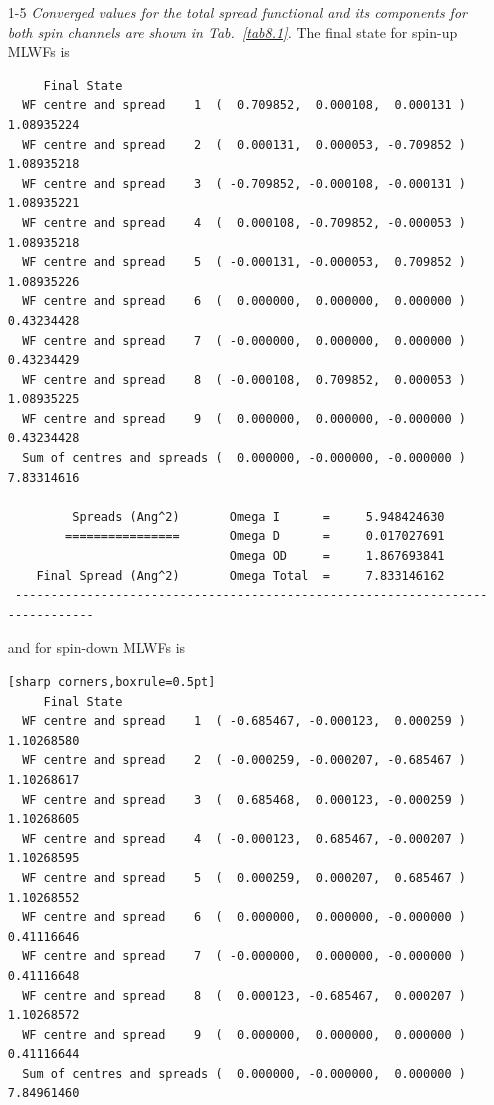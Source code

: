 \begin{enumerate}
	\item[1-5] {\it Converged values for the total spread functional and its components for both spin channels are shown in Tab.~\ref{tab8.1}.}
	The final state for spin-up MLWFs is
	\begin{tcolorbox}[sharp corners,boxrule=0.5pt]
	{\small
	\begin{verbatim}
	 Final State
  WF centre and spread    1  (  0.709852,  0.000108,  0.000131 )     1.08935224
  WF centre and spread    2  (  0.000131,  0.000053, -0.709852 )     1.08935218
  WF centre and spread    3  ( -0.709852, -0.000108, -0.000131 )     1.08935221
  WF centre and spread    4  (  0.000108, -0.709852, -0.000053 )     1.08935218
  WF centre and spread    5  ( -0.000131, -0.000053,  0.709852 )     1.08935226
  WF centre and spread    6  (  0.000000,  0.000000,  0.000000 )     0.43234428
  WF centre and spread    7  ( -0.000000,  0.000000,  0.000000 )     0.43234429
  WF centre and spread    8  ( -0.000108,  0.709852,  0.000053 )     1.08935225
  WF centre and spread    9  (  0.000000,  0.000000, -0.000000 )     0.43234428
  Sum of centres and spreads (  0.000000, -0.000000, -0.000000 )     7.83314616

         Spreads (Ang^2)       Omega I      =     5.948424630
        ================       Omega D      =     0.017027691
                               Omega OD     =     1.867693841
    Final Spread (Ang^2)       Omega Total  =     7.833146162
 ------------------------------------------------------------------------------
	\end{verbatim}
	}
	\end{tcolorbox}
	and for spin-down MLWFs is
	  \begin{tcolorbox}
  {\small
	\begin{verbatim}[sharp corners,boxrule=0.5pt]
	 Final State
  WF centre and spread    1  ( -0.685467, -0.000123,  0.000259 )     1.10268580
  WF centre and spread    2  ( -0.000259, -0.000207, -0.685467 )     1.10268617
  WF centre and spread    3  (  0.685468,  0.000123, -0.000259 )     1.10268605
  WF centre and spread    4  ( -0.000123,  0.685467, -0.000207 )     1.10268595
  WF centre and spread    5  (  0.000259,  0.000207,  0.685467 )     1.10268552
  WF centre and spread    6  (  0.000000,  0.000000, -0.000000 )     0.41116646
  WF centre and spread    7  ( -0.000000,  0.000000, -0.000000 )     0.41116648
  WF centre and spread    8  (  0.000123, -0.685467,  0.000207 )     1.10268572
  WF centre and spread    9  (  0.000000,  0.000000,  0.000000 )     0.41116644
  Sum of centres and spreads (  0.000000, -0.000000,  0.000000 )     7.84961460


\end{verbatim}}
\end{tcolorbox}
\end{enumerate}
